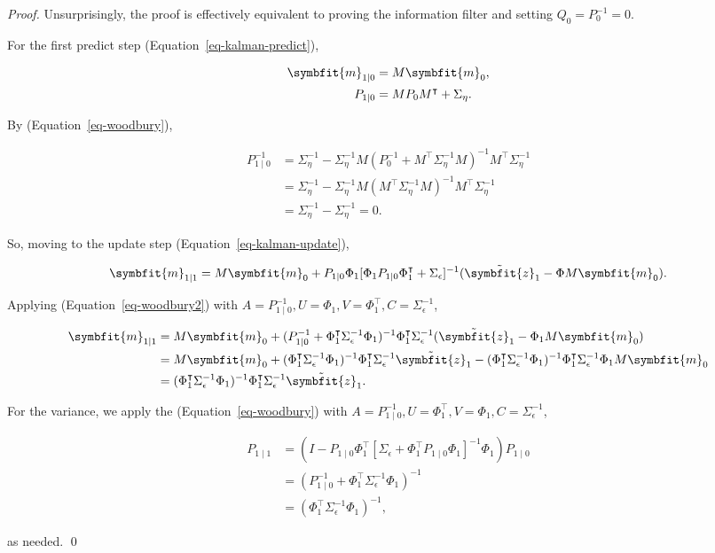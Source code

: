 \documentclass[
]{report}
\newcommand{\bv}[1]{\symbfit{#1}}
\theoremstyle{plain}
\theoremstyle{plain}
\theoremstyle{plain}
\theoremstyle{remark}
\begin{document}
\begin{proof}
Unsurprisingly, the proof is effectively equivalent to proving the
information filter and setting \(Q_0 = P_0^{-1}=0\).

For the first predict step (Equation~\ref{eq-kalman-predict}),

\[\begin{split}
  \bv m_{1\mid0} &= M \bv m_0,\\
  P_{1\mid0} &= M P_0 M^\intercal + \Sigma_\eta.
\end{split}
\]

By (Equation~\ref{eq-woodbury}),

\[\begin{split}
  P_{1\mid0}^{-1} &= \Sigma_\eta^{-1} - \Sigma_\eta^{-1} M (P_0^{-1} + M^\intercal \Sigma_\eta^{-1} M)^{-1}M^\intercal\Sigma_\eta^{-1}\\
  &= \Sigma_\eta^{-1} - \Sigma_\eta^{-1} M (M^\intercal \Sigma_\eta^{-1} M)^{-1}M^\intercal\Sigma_\eta^{-1}\\
  &= \Sigma_\eta^{-1} - \Sigma_\eta^{-1} = 0.
\end{split}
\]

So, moving to the update step (Equation~\ref{eq-kalman-update}),

\[\begin{split}
  \bv m_{1\mid1} = M \bv m_0 + P_{1\mid0}\Phi_1 [\Phi_1 P_{1\mid0} \Phi_1^\intercal + \Sigma_\epsilon]^{-1}(\tilde{\bv{z}}_1 - \Phi M \bv m_0).\\
\end{split}
\]

Applying (Equation~\ref{eq-woodbury2}) with
\(A = P_{1\mid0}^{-1}, U=\Phi_1, V=\Phi_1^\intercal, C=\Sigma_\epsilon^{-1}\),

\[\begin{split}
  \bv m_{1\mid1} &= M \bv m_0 + (P_{1\mid0}^{-1} + \Phi_1^\intercal\Sigma_\epsilon^{-1} \Phi_1)^{-1}\Phi_1^\intercal \Sigma_\epsilon^{-1}(\tilde{\bv{z}}_1 - \Phi_1 M\bv m_0)\\
  &= M \bv m_0 + (\Phi_1^\intercal\Sigma_\epsilon^{-1}\Phi_1)^{-1}\Phi_1^\intercal\Sigma_\epsilon^{-1} \tilde{\bv{z}}_1 - (\Phi_1^\intercal\Sigma_\epsilon^{-1}\Phi_1)^{-1}\Phi_1^\intercal\Sigma_\epsilon^{-1}\Phi_1M\bv m_0\\
  &= (\Phi_1^\intercal\Sigma_\epsilon^{-1}\Phi_1)^{-1}\Phi_1^\intercal\Sigma_\epsilon^{-1} \tilde{\bv{z}}_1.
\end{split}
\]

For the variance, we apply the (Equation~\ref{eq-woodbury}) with
\(A = P_{1\mid0}^{-1}, U=\Phi_1^\intercal, V=\Phi_1, C=\Sigma_\epsilon^{-1}\),

\[\begin{split}
  P_{1\mid1} &= (I - P_{1\mid0}\Phi_1^\intercal[\Sigma_\epsilon + \Phi_1^\intercal P_{1\mid0}\Phi_1]^{-1}\Phi_1)P_{1\mid0}\\
  &= (P_{1\mid0}^{-1} + \Phi_1^\intercal \Sigma_\epsilon^{-1}\Phi_1)^{-1}\\
  &= (\Phi_1^\intercal \Sigma_\epsilon^{-1}\Phi_1)^{-1},
\end{split}
\]

as needed. \qed
\end{proof}
\end{document}
